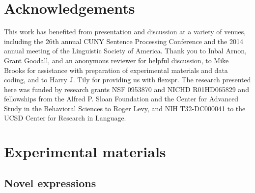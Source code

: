 \documentclass[authoryear]{elsarticle}
\begin{document}

\section*{Acknowledgements}
This work has benefited from presentation and discussion at a variety of venues, including the 26th annual CUNY Sentence Processing Conference and the 2014 annual meeting of the Linguistic Society of America. Thank you to Inbal Arnon, Grant Goodall, and an anonymous reviewer for helpful discussion, to Mike Brooks for assistance with preparation of experimental materials and data coding, and to Harry J. Tily for providing us with flexspr. The research presented here was funded by research grants NSF 0953870 and NICHD R01HD065829 and fellowships from the Alfred P. Sloan Foundation and the Center for Advanced Study in the Behavioral Sciences to Roger Levy, and NIH T32-DC000041 to the UCSD Center for Research in Language.

\appendix
\section{Experimental materials}
\subsection{Novel expressions}
\end{document}
